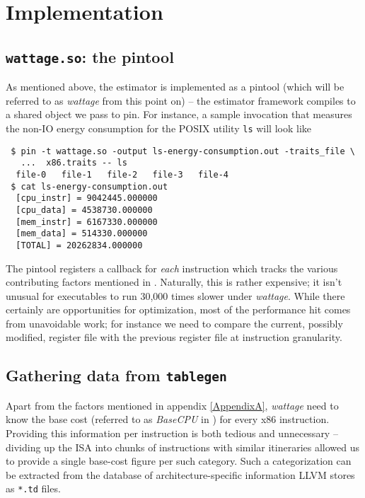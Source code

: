 \section{Implementation}

\subsection{\texttt{wattage.so}: the pintool}

As mentioned above, the estimator is implemented as a pintool (which
will be referred to as \textit{wattage} from this point on) -- the
estimator framework compiles to a shared object we pass to pin.  For
instance, a sample invocation that measures the non-IO energy
consumption for the POSIX utility \texttt{ls} will look like

\begin{verbatim}
 $ pin -t wattage.so -output ls-energy-consumption.out -traits_file \
   ...  x86.traits -- ls
  file-0   file-1   file-2   file-3   file-4
 $ cat ls-energy-consumption.out
  [cpu_instr] = 9042445.000000
  [cpu_data] = 4538730.000000
  [mem_instr] = 6167330.000000
  [mem_data] = 514330.000000
  [TOTAL] = 20262834.000000
\end{verbatim}

The pintool registers a callback for \textit{each} instruction which
tracks the various contributing factors mentioned in \cite{steinke}.
Naturally, this is rather expensive; it isn't unusual for executables
to run 30,000 times slower under \textit{wattage}.  While there
certainly are opportunities for optimization, most of the performance
hit comes from unavoidable work; for instance we need to compare the
current, possibly modified, register file with the previous register
file at instruction granularity.

\subsection{Gathering data from \texttt{tablegen}}

Apart from the factors mentioned in appendix \ref{AppendixA},
\textit{wattage} need to know the base cost (referred to as
\textit{BaseCPU} in \cite{steinke}) for every x86 instruction.
Providing this information per instruction is both tedious and
unnecessary -- dividing up the ISA into chunks of instructions with
similar itineraries allowed us to provide a single base-cost figure
per such category.  Such a categorization can be extracted from the
database of architecture-specific information LLVM stores as
\texttt{*.td} files.

